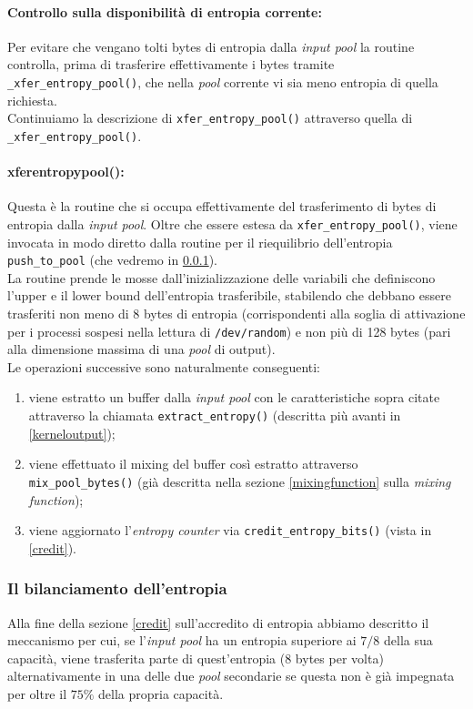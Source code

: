 \documentclass{article}
\begin{document}
 \paragraph{Controllo sulla disponibilità di entropia corrente:} Per evitare
 che vengano tolti bytes di entropia dalla \emph{input pool} la routine
 controlla, prima di trasferire effettivamente i bytes tramite
 \verb+_xfer_entropy_pool()+, che nella \emph{pool} corrente vi sia meno
 entropia di quella richiesta. \\Continuiamo la descrizione di
 \verb+xfer_entropy_pool()+ attraverso quella di \verb+_xfer_entropy_pool()+.
 
 \paragraph{\textunderscore{}xfer\textunderscore{}entropy\textunderscore{}pool():}
 Questa è la routine che si occupa effettivamente del trasferimento di bytes di
 entropia dalla \emph{input pool}. Oltre che essere estesa da
 \verb+xfer_entropy_pool()+, viene invocata in modo diretto dalla routine per il
 riequilibrio dell'entropia \verb+push_to_pool+ (che
 vedremo in \ref{bilanciamento}).\\
 La routine prende le mosse dall'inizializzazione delle variabili che
 definiscono l'upper e il lower bound dell'entropia trasferibile, stabilendo che
 debbano essere trasferiti non meno di 8 bytes di entropia (corrispondenti alla
 soglia di attivazione per i processi sospesi nella lettura di
 \verb+/dev/random+) e non più di 128 bytes (pari alla dimensione massima di
 una \emph{pool} di output).\\
 Le operazioni successive sono naturalmente conseguenti: 
 \begin{enumerate}
   \item viene estratto un buffer dalla \emph{input pool} con le caratteristiche
   sopra citate attraverso la chiamata \verb+extract_entropy()+ (descritta più
   avanti in \ref{kerneloutput});
   \item viene effettuato il mixing del buffer così estratto attraverso
   \verb+mix_pool_bytes()+ (già descritta nella sezione
   \ref{mixingfunction} sulla \emph{mixing function});
   \item viene aggiornato l'\emph{entropy counter} via
   \verb+credit_entropy_bits()+ (vista in \ref{credit}).
 \end{enumerate}
 
 \subsubsection{Il bilanciamento dell'entropia} \label{bilanciamento}
 Alla fine della sezione \ref{credit} sull'accredito di entropia abbiamo
 descritto il meccanismo per cui, se l'\emph{input pool} ha un entropia
 superiore ai $7/8$ della sua capacità, viene trasferita parte di quest'entropia
 (8 bytes per volta) alternativamente in una delle due \emph{pool} secondarie se
 questa non è già impegnata per oltre il $75\%$ della propria capacità.
\end{document}
